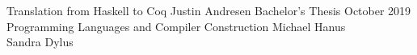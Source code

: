 \documentclass[10pt]{book}
\begin{document}
\frontmatter

\studtitlepage%
  {Translation from Haskell to Coq}
  {}%
  {Justin Andresen}%
  {Bachelor's Thesis}%
  {October 2019}%
  {Programming Languages and Compiler Construction}%
  {Michael Hanus \\ Sandra Dylus}
\cleardoublepage
\eidesstatt


\tableofcontents

\setlength{\parindent}{0em}
\setlength{\parskip}{1em}

\mainmatter







\appendix

\backmatter
\nocite{*} %
\tocbibliography
\end{document}
